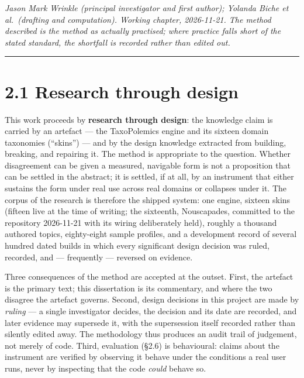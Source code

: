 \emph{Jason Mark Wrinkle (principal investigator and first author);
Yolanda Biche et al.~(drafting and computation). Working chapter,
2026-11-21. The method described is the method as actually practised;
where practice falls short of the stated standard, the shortfall is
recorded rather than edited out.}

\begin{center}\rule{0.5\linewidth}{0.5pt}\end{center}

\section{2.1 Research through design}\label{research-through-design}

This work proceeds by \textbf{research through design}: the knowledge
claim is carried by an artefact --- the TaxoPolemics engine and its
sixteen domain taxonomies (``skins'') --- and by the design knowledge
extracted from building, breaking, and repairing it. The method is
appropriate to the question. Whether disagreement can be given a
measured, navigable form is not a proposition that can be settled in the
abstract; it is settled, if at all, by an instrument that either
sustains the form under real use across real domains or collapses under
it. The corpus of the research is therefore the shipped system: one
engine, sixteen skins (fifteen live at the time of writing; the
sixteenth, Nouscapades, committed to the repository 2026-11-21 with its
wiring deliberately held), roughly a thousand authored topics,
eighty-eight sample profiles, and a development record of several
hundred dated builds in which every significant design decision was
ruled, recorded, and --- frequently --- reversed on evidence.

Three consequences of the method are accepted at the outset. First, the
artefact is the primary text; this dissertation is its commentary, and
where the two disagree the artefact governs. Second, design decisions in
this project are made by \emph{ruling} --- a single investigator
decides, the decision and its date are recorded, and later evidence may
supersede it, with the supersession itself recorded rather than silently
edited away. The methodology thus produces an audit trail of judgement,
not merely of code. Third, evaluation (\S 2.6) is behavioural: claims
about the instrument are verified by observing it behave under the
conditions a real user runs, never by inspecting that the code
\emph{could} behave so.

